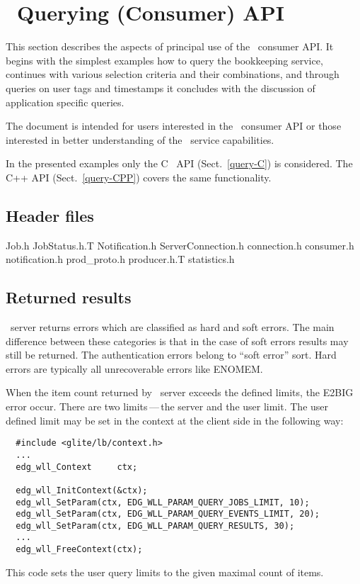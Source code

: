
\section{\LB\ Querying (Consumer) API}

\def\partitle#1{\par{\textbf{#1}}\par}

\label{ConsOview}
This section describes the aspects of principal use of the \LB\ consumer API.
It begins with the simplest examples how to query the bookkeeping
service, continues with various selection criteria and their combinations, and
through queries on user tags and timestamps it concludes with the discussion of
application specific queries.

The document is intended for users interested in the \LB\
consumer API or those interested in better understanding of the \LB\ service 
capabilities.

In the presented examples only the C \LB\ API (Sect.~\ref{query-C}) is considered.
The C++ API (Sect.~\ref{query-CPP})  covers the same functionality.

\subsection{Header files}

Job.h
JobStatus.h.T
Notification.h
ServerConnection.h
connection.h
consumer.h
notification.h
prod\_proto.h
producer.h.T
statistics.h



\subsection{Returned results}

\LB\ server returns errors which are classified as hard and soft errors.
The main difference between these categories is that in the case of soft
errors results may still be returned.
The authentication errors belong to
``soft error'' sort. Hard errors are typically all unrecoverable errors like ENOMEM.

When the item count returned by \LB\ server exceeds the defined limits, the E2BIG error occur.
There are two limits\,---\,the server and the user limit. The user defined limit may be set in
the context at the client side in the following way:
\begin{verbatim}
  #include <glite/lb/context.h>
  ...
  edg_wll_Context     ctx;    

  edg_wll_InitContext(&ctx);
  edg_wll_SetParam(ctx, EDG_WLL_PARAM_QUERY_JOBS_LIMIT, 10);
  edg_wll_SetParam(ctx, EDG_WLL_PARAM_QUERY_EVENTS_LIMIT, 20);
  edg_wll_SetParam(ctx, EDG_WLL_PARAM_QUERY_RESULTS, 30);
  ...
  edg_wll_FreeContext(ctx);
\end{verbatim}
This code sets the user query limits to the given maximal count of items.

